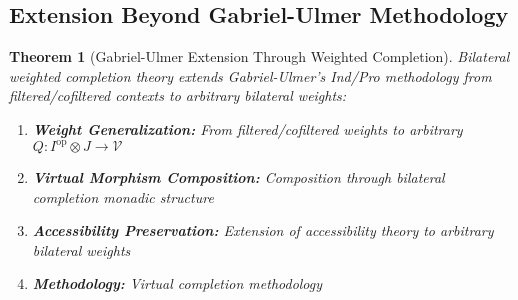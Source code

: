 \documentclass[11pt]{article}
\theoremstyle{plain}
\newtheorem{theorem}{Theorem}[section]
\theoremstyle{definition}
\theoremstyle{remark}
\newcommand{\V}{\mathcal{V}}
\newcommand{\op}{\mathrm{op}}
\begin{document}
\subsection{Extension Beyond Gabriel-Ulmer Methodology}

\begin{theorem}[Gabriel-Ulmer Extension Through Weighted Completion]\label{thm:gabriel-ulmer-extension}
Bilateral weighted completion theory extends Gabriel-Ulmer's Ind/Pro methodology from filtered/cofiltered contexts to arbitrary bilateral weights:

\begin{enumerate}
\item \textbf{Weight Generalization:} From filtered/cofiltered weights to arbitrary $Q : I^{\op} \otimes J \to \V$

\item \textbf{Virtual Morphism Composition:} Composition through bilateral completion monadic structure

\item \textbf{Accessibility Preservation:} Extension of accessibility theory to arbitrary bilateral weights

\item \textbf{Methodology:} Virtual completion methodology
\end{enumerate}
\end{theorem}
\end{document}
